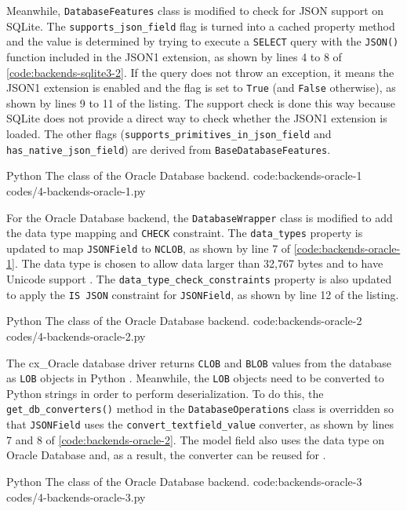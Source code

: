 Meanwhile, \verb|DatabaseFeatures| class is modified to check for JSON support
on SQLite. The \verb|supports_json_field| flag is turned into a cached property
method and the value is determined by trying to execute a \verb|SELECT| query
with the \verb|JSON()| function included in the JSON1 extension, as shown by
lines 4 to 8 of \autoref{code:backends-sqlite3-2}. If the query does not throw
an exception, it means the JSON1 extension is enabled and the flag is set to
\verb|True| (and \verb|False| otherwise), as shown by lines 9 to 11 of the
listing. The support check is done this way because SQLite does not provide a
direct way to check whether the JSON1 extension is loaded. The other flags
(\verb|supports_primitives_in_json_field| and \verb|has_native_json_field|)
are derived from \verb|BaseDatabaseFeatures|.

\listing
{Python}
{The  class of the Oracle Database backend.}
{code:backends-oracle-1}
{codes/4-backends-oracle-1.py}

For the Oracle Database backend, the \verb|DatabaseWrapper| class is modified
to add the data type mapping and \verb|CHECK| constraint. The \verb|data_types|
property is updated to map \verb|JSONField| to \verb|NCLOB|, as shown by line 7
of \autoref{code:backends-oracle-1}. The  data type is chosen to
allow data larger than 32,767 bytes and to have Unicode support
\cite{oracle:overview-json, oracle:database-concepts}. The
\verb|data_type_check_constraints| property is also updated to apply the
\verb|IS JSON| constraint for \verb|JSONField|, as shown by line 12 of the
listing.

\listing
{Python}
{The  class of the Oracle Database backend.}
{code:backends-oracle-2}
{codes/4-backends-oracle-2.py}

The cx\_Oracle database driver returns \verb|CLOB| and \verb|BLOB| values from
the database as \verb|LOB| objects in Python \cite{cxoracle:lob}. Meanwhile,
the \verb|LOB| objects need to be converted to Python strings in order to
perform deserialization. To do this, the \verb|get_db_converters()| method in
the \verb|DatabaseOperations| class is overridden so that \verb|JSONField| uses
the \verb|convert_textfield_value| converter, as shown by lines 7 and 8 of
\autoref{code:backends-oracle-2}. The  model field also uses
the  data type on Oracle Database and, as a result, the converter
can be reused for .

\listing
{Python}
{The  class of the Oracle Database backend.}
{code:backends-oracle-3}
{codes/4-backends-oracle-3.py}

